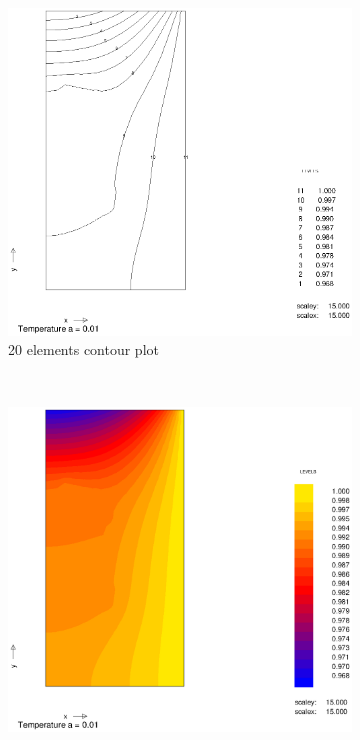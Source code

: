 \documentclass[10pt,a4paper]{article}
\begin{document}
\begin{figure}[h]
\centering
        \begin{subfigure}[b]{0.45\textwidth}
                \includegraphics[width=\textwidth]{cont_a001_20el}
                \caption{20 elements contour plot}
                \label{fig:cont_a001_20el}
        \end{subfigure}
        ~
        \begin{subfigure}[b]{0.45\textwidth}
                \includegraphics[width=\textwidth]{colplot_a001_20el}

\end{subfigure}
\end{figure}
\end{document}
